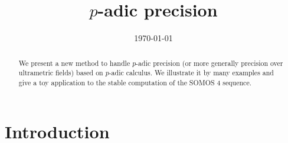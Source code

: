 \documentclass{lms}
\begin{document}
\newtheorem{theo}{Theorem}[section]
\newtheorem{lem}[theo]{Lemma}
\newtheorem{prop}[theo]{Proposition}
\newtheorem{cor}[theo]{Corollary}
\newtheorem{quest}[theo]{Question}
\newtheorem{rem}[theo]{Remark}
\newtheorem{ex}[theo]{Example}
\newtheorem{deftn}[theo]{Definition}
\newtheorem{rmk}[theo]{Remark}

\newcommand{\Z}{\mathbb Z}
\newcommand{\Zp}{\Z_p}
\newcommand{\Q}{\mathbb Q}
\newcommand{\Qp}{\Q_p}
\newcommand{\Fp}{\mathbb{F}_p}
\newcommand{\R}{\mathbb R}
\renewcommand{\O}{\mathcal O}
\newcommand{\OK}{\mathcal{O}_K}
\newcommand{\XX}{\mathbf X}
\newcommand{\trans}{{}^{\text t}}

\newcommand{\GL}{\text{\rm GL}}

\newcommand{\val}{\text{\rm val}}
\newcommand{\pr}{\text{\rm pr}}
\newcommand{\tr}{\text{\rm Tr}}
\newcommand{\com}{\text{\rm Com}}
\newcommand{\Grass}{\text{\rm Grass}}
\renewcommand{\prec}{\text{\rm prec}}

\newcommand{\lb}{\ensuremath{\llbracket}}
\newcommand{\rb}{\ensuremath{\rrbracket}}
\newcommand{\lp}{(\!(}
\newcommand{\rp}{)\!)}
\newcommand{\col}{\: : \:}

\def\todo#1{\ \!\!{\color{red} #1}}
\def\todofor#1#2{\ \!\!{\color{purple} {\bf #1}: #2}}

\title{$p$-adic precision}
\date\today

\maketitle
\begin{abstract}
We present a new method to handle $p$-adic precision (or more generally
precision over ultrametric fields) based on $p$-adic calculus.
We illustrate it by many examples and give a toy application to the
stable computation of the SOMOS 4 sequence.
\end{abstract}

\setcounter{tocdepth}{1}
\tableofcontents

\section{Introduction}
\end{document}
